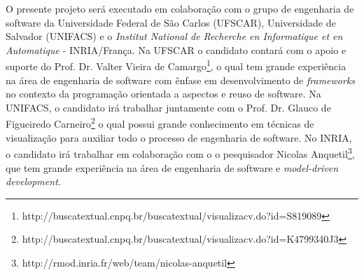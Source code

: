 \documentclass[12pt]{article}
\begin{document}
O presente projeto será executado em colaboração com o grupo de engenharia de software da Universidade Federal de São Carlos (UFSCAR), Universidade de Salvador (UNIFACS) e o \textit{Institut National de Recherche en Informatique et en Automatique} - INRIA/França. Na UFSCAR o candidato contará com o apoio e suporte do Prof. Dr. Valter Vieira de Camargo\footnote{http://buscatextual.cnpq.br/buscatextual/visualizacv.do?id=S819089}, o qual tem grande experiência na área de engenharia de software com ênfase em desenvolvimento de \textit{frameworks} no contexto da programação orientada a aspectos e reuso de software. Na UNIFACS, o candidato irá trabalhar juntamente com o Prof. Dr. Glauco de Figueiredo Carneiro\footnote{http://buscatextual.cnpq.br/buscatextual/visualizacv.do?id=K4799340J3} o qual possui grande conhecimento em técnicas de visualização para auxiliar todo o processo de engenharia de software. No INRIA, o candidato irá trabalhar em colaboração com o o pesquisador Nicolas Anquetil\footnote{http://rmod.inria.fr/web/team/nicolas-anquetil}, que tem grande experiência na área de engenharia de software e \textit{model-driven development}.






\end{document}
